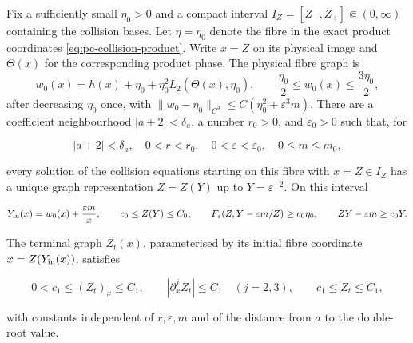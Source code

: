 \begin{lemma}
\label{lem:pc-finite-fibre-transition}
Fix a sufficiently small $\eta _0>0$ and a compact interval
$I_Z=[Z_-,Z_+]\Subset(0,\infty)$ containing the collision bases.  Let
$\eta=\eta _0$ denote the fibre in the exact product coordinates
\eqref{eq:pc-collision-product}.  Write $x=Z$ on its physical image and
$\Theta(x)$ for the corresponding product phase.  The physical fibre graph
is
\[
 w_0(x)=h(x)+\eta _0+\eta _0^2L_2(\Theta(x),\eta _0),
 \qquad
 \frac{\eta _0}{2}\le w_0(x)\le\frac{3\eta _0}{2},
\]
after decreasing $\eta _0$ once, with
$\|w_0-\eta _0\|_{C^3}\le C(\eta _0^2+\varepsilon^3m)$.
There are a coefficient neighbourhood $|a+2|<\delta_a$, a number
$r_0>0$, and $\varepsilon _0>0$ such that, for

\[
 |a+2|<\delta_a,\quad 0<r<r_0,\quad 0<\varepsilon<\varepsilon _0,
 \quad 0\le m\le m_0,
\]

every solution of the collision equations starting on this fibre with
$x=Z\in I_Z$ has a unique graph representation $Z=Z(Y)$ up to
$Y=\varepsilon^{-2}$.  On this interval

\[
 Y_{\rm in}(x)=w_0(x)+\frac{\varepsilon m}{x},\qquad
 c_0\le Z(Y)\le C_0,\qquad
 F_s(Z,Y-\varepsilon m/Z)\ge c_0\eta _0,
 \qquad ZY-\varepsilon m\ge c_0Y .
\]

The terminal graph $Z_t(x)$, parameterised by its initial fibre coordinate
$x=Z(Y_{\rm in}(x))$, satisfies

\[
 0<c_1\le (Z_t)_x\le C_1,
 \qquad |\partial_x^j Z_t|\le C_1\quad (j=2,3),
 \qquad c_1\le Z_t\le C_1,
\]

with constants independent of $r,\varepsilon,m$ and of the distance from
$a$ to the double-root value.
\end{lemma}

